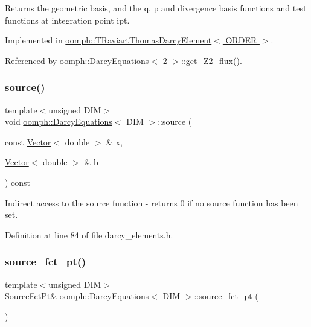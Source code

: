 Returns the geometric basis, and the q, p and divergence basis functions and test functions at integration point ipt. 



Implemented in \hyperlink{classoomph_1_1TRaviartThomasDarcyElement_afdb0540d59f54d7ef112a85a386f7991}{oomph\+::\+T\+Raviart\+Thomas\+Darcy\+Element$<$ O\+R\+D\+E\+R $>$}.



Referenced by oomph\+::\+Darcy\+Equations$<$ 2 $>$\+::get\+\_\+\+Z2\+\_\+flux().

\mbox{\label{classoomph_1_1DarcyEquations_aca046624f129486cc4ced6a2c056a53c}} 
\subsubsection{\texorpdfstring{source()}{source()}}
{\footnotesize\ttfamily template$<$unsigned D\+IM$>$ \\
void \hyperlink{classoomph_1_1DarcyEquations}{oomph\+::\+Darcy\+Equations}$<$ D\+IM $>$\+::source (\begin{DoxyParamCaption}\item[{const \hyperlink{classoomph_1_1Vector}{Vector}$<$ double $>$ \&}]{x,  }\item[{\hyperlink{classoomph_1_1Vector}{Vector}$<$ double $>$ \&}]{b }\end{DoxyParamCaption}) const\hspace{0.3cm}{\ttfamily [inline]}}



Indirect access to the source function -\/ returns 0 if no source function has been set. 



Definition at line 84 of file darcy\+\_\+elements.\+h.

\mbox{\label{classoomph_1_1DarcyEquations_abe4a6fd3c37700bcf18a51a71e2d3c0d}} 
\subsubsection{\texorpdfstring{source\+\_\+fct\+\_\+pt()}{source\_fct\_pt()}\hspace{0.1cm}{\footnotesize\ttfamily [1/2]}}
{\footnotesize\ttfamily template$<$unsigned D\+IM$>$ \\
\hyperlink{classoomph_1_1DarcyEquations_adcf88d9573b0f1c1988bdae6234eb7f8}{Source\+Fct\+Pt}\& \hyperlink{classoomph_1_1DarcyEquations}{oomph\+::\+Darcy\+Equations}$<$ D\+IM $>$\+::source\+\_\+fct\+\_\+pt (\begin{DoxyParamCaption}{ }\end{DoxyParamCaption})\hspace{0.3cm}{\ttfamily [inline]}}




